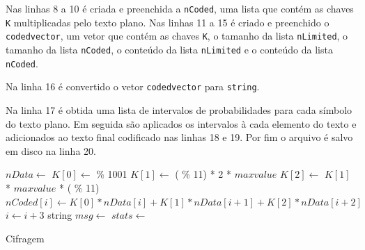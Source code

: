 Nas linhas 8 a 10 é criada e preenchida a \texttt{nCoded}, uma lista que contém as chaves \texttt{K} multiplicadas pelo texto plano. Nas linhas 11 a 15 é criado e preenchido o \texttt{codedvector}, um vetor que contém as chaves \texttt{K}, o tamanho da lista \texttt{nLimited}, o tamanho da lista \texttt{nCoded}, o conteúdo da lista \texttt{nLimited} e o conteúdo da lista \texttt{nCoded}.

Na linha 16 é convertido o vetor \texttt{codedvector} para \texttt{string}.

Na linha 17 é obtida uma lista de intervalos de probabilidades para cada símbolo do texto plano. Em seguida são aplicados os intervalos à cada elemento do texto e adicionados ao texto final codificado nas linhas 18 e 19. Por fim o arquivo é salvo em disco na linha 20.
		
\begin{algorithm}[t]
\begin{algorithmic}[1]
\footnotesize
    \vspace{0.2em}
    \State $nData \gets$ 
    \vspace{0.5em}
    \vspace{0.2em}
            \vspace{0.2em}
            \State {}
        \EndIf
    \EndFor
    \vspace{0.5em}
    \State $K[0] \gets$  \% 1001
    \State $K[1] \gets$ ( \% 11) * 2 * $maxvalue$
    \State $K[2] \gets$ $K[1]$ * $maxvalue$ * ( \% 11)
    \vspace{0.5em}
        \vspace{0.2em}
        \State $nCoded[i] \gets K[0]*nData[i] + K[1]*nData[i+1] + K[2]*nData[i+2]$
        \State $i \gets i + 3$
    \EndWhile
    \vspace{0.5em}
    \State {}
    \State {}
    \State {}
    \State {}
    \State {}
    \vspace{0.5em}
    \State string $msg \gets$ 
    \vspace{0.5em}
    \State $stats \gets$ 
        \vspace{0.2em}
        \State {}
    \EndFor
    \vspace{0.5em}
    \State {}
\end{algorithmic}
\caption{Cifragem}
\label{algorithm: gmprc}
\end{algorithm}

